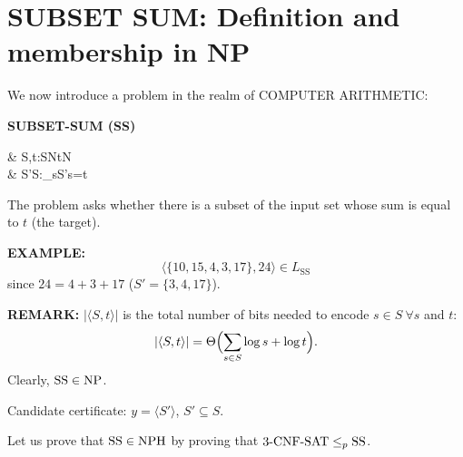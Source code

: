 \section{SUBSET SUM: Definition and membership in NP}
We now introduce a problem in the realm of COMPUTER ARITHMETIC:

\textbf{SUBSET-SUM (SS)}

\begin{notesproblem}
 & \langle S,t\rangle:S\subseteq\mathbb Nt\in\mathbb N\\
 & \exists S'\subseteq S:\sum_{s\in S'}s=t
\end{notesproblem}

The problem asks whether there is a subset of the input set whose sum is equal to $t$ (the target).

\textbf{EXAMPLE:}
\[\langle\{10,15,4,3,17\},24\rangle\in L_{\mathrm{SS}}\]
since $24=4+3+17$ ($S'=\{3,4,17\}$).

\textbf{REMARK:} $|\langle S,t\rangle|$ is the total number of bits needed to encode $s\in S\ \forall s$ and $t$:
\[|\langle S,t\rangle|=\Theta\Bigl(\sum_{s\in S}\log s+\log t\Bigr).\]
Clearly, $\mathrm{SS}\in\mathrm{NP}$.

Candidate certificate: $y=\langle S'\rangle$, $S'\subseteq S$.

Let us prove that $\mathrm{SS}\in\mathrm{NPH}$ by proving that $\mathrm{3\text{-}CNF\text{-}SAT}\leq_p\mathrm{SS}$.
